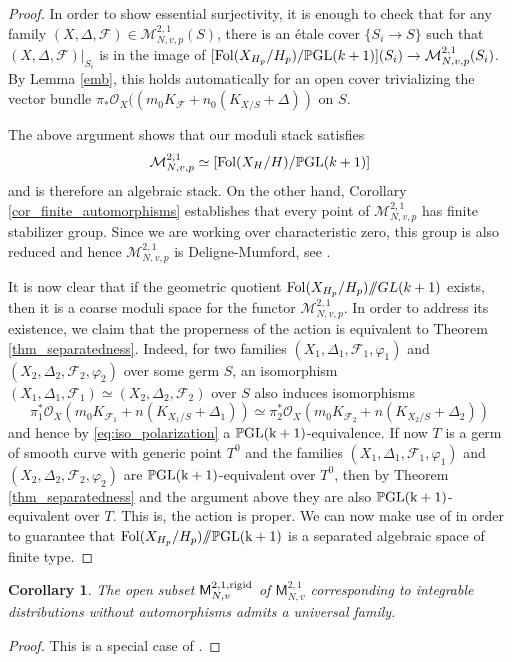 \documentclass[12pt, a4paper]{amsart}
\newcommand\PP{\mathbb{P}}
\newcommand\OO{\mathcal{O}}
\newcommand\FF{\mathcal{F}}
\newcounter{Theorem}
\newtheorem{corollary}[theorem]{Corollary}
\theoremstyle{definition}
\theoremstyle{named}
\begin{document}
\begin{proof}
In order to show essential surjectivity, it is enough to check that for any family $(X,\Delta,\FF)\in \mathcal M^{2,1}_{N, v,p}(S)$, there is an \'etale cover $\{S_i \to S \}$ such that 
$(X,\Delta,\FF)\vert_{S_i}$ is in the image of $[{\rm Fol}(X_{H_p}/H_p)/{\rm \PP GL}(k+1)](S_i)\to \mathcal{M}^{2,1}_{N, v,p} (S_i)$. 
By Lemma \ref{emb}, this holds automatically for an open cover trivializing the vector bundle $\pi_*\OO_X((m_0 K_\FF + n_0 (K_{X/S}+\Delta))$ on $S$.

The above argument shows that our moduli stack satisfies 
\begin{align*}
\mathcal M^{2,1}_{N, v,p} \simeq [{\rm Fol}(X_H/H)/{\rm \PP GL}(k+1)]
\end{align*}
and is therefore an algebraic stack.
On the other hand,  Corollary \ref{cor_finite_automorphisms} establishes that every point of $\mathcal M^{2,1}_{N, v,p}$ has finite stabilizer group. 
Since we are working over characteristic zero, this group is also reduced and hence 
$\mathcal M^{2,1}_{N,v,p}$ is Deligne-Mumford, see \cite[Theorem 4.21]{DM69}.


It is now clear that if the geometric quotient ${\rm Fol}(X_{H_p}/H_p)/\!\!/GL(k+1)$ exists, then it is a coarse moduli space for the functor $\mathcal M^{2,1}_{N, v,p}$. In order to address its existence, 
we claim that the properness of the action is equivalent to Theorem \ref{thm_separatedness}. Indeed, for two families $(X_1,\Delta_1,\FF_1,\varphi_1)$ and $(X_2,\Delta_2, \FF_2,\varphi_2)$ over some germ $S$, an isomorphism $(X_1, \Delta_1,\FF_1)\simeq (X_2,\Delta_2,\FF_2)$ over $S$ also induces isomorphisms 
   $$\pi_1^*\OO_X(m_0K_{\FF_1} + n (K_{X_1/S}+\Delta_1)) \simeq \pi_2^*\OO_X(m_0K_{\FF_2} + n (K_{X_2/S}+\Delta_2))$$
   and hence by \eqref{eq:iso_polarization} a $\PP \rm GL(k+1)$-equivalence. 
   If now $T$ is a germ of smooth curve with generic point $T^0$ and the families $(X_1,\Delta_1,\FF_1,\varphi_1)$ and $(X_2,\Delta_2, \FF_2,\varphi_2)$ are $\PP \rm GL(k+1)$-equivalent over $T^0$, then by Theorem \ref{thm_separatedness} and the argument above they are also $\PP \rm GL(k+1)$-equivalent over $T$. This is, the action is proper.
   We can now make use of  \cite[Theorem 1.5]{Kollar97} in order to guarantee that ${\rm Fol}(X_{H_p}/H_p)/\!\!/\PP \rm GL(k+1)$ is a separated algebraic space of finite type. 
\end{proof}



\begin{corollary} \label{cor:rigid_univ_family}
The open subset $\mathsf M^{2, 1, {\rm rigid}}_{N, v}$ of $\mathsf M^{2, 1}_{N, v}$ corresponding to integrable distributions without automorphisms admits a universal family.    
\end{corollary}
\begin{proof}
    This is a special case of \cite[Theorem 2.2.5]{conrad2007arithmetic}. 
\end{proof}
\end{document}
